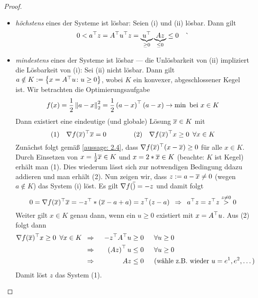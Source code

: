 \begin{proof}
	\begin{itemize}[leftmargin=*, nolistsep]
		\item \textit{höchstens} eines der Systeme ist lösbar: Seien (i) und (ii) lösbar. Dann gilt
		\begin{equation*}
			0 < a^{\top} z = A^{\top}u^{\top} z = \underbrace{u^{\top}}_{\ge 0} \underbrace{A z}_{\le 0} \le 0 \quad \lightning
		\end{equation*}
		\item  \textit{mindestens} eines der Systeme ist lösbar --- die Unlösbarkeit von (ii) impliziert die Lösbarkeit von (i):  Sei (ii) nicht lösbar. Dann gilt
		$a \notin K \mathrel{:=} \left\{ x = A^{\top} u \colon u \ge 0 \right\}$, wobei $K$ ein konvexer, abgeschlossener Kegel ist. Wir betrachten die Optimierungsaufgabe
		\begin{equation*}
			f(x) = \frac{1}{2} \left\lVert a-x \right\rVert_2^2 = \frac{1}{2} \left( a-x \right)^{\top}(a-x) \to \min \text{ bei } x \in K
		\end{equation*}
		Dann existiert eine eindeutige (und globale) Lösung $\overline{x} \in K$ mit
		\begin{equation*}
			(1) \quad \nabla f(\overline{x})^{\top} \overline{x} = 0 
			\qquad \qquad 
			(2) \quad \nabla f(\overline{x})^{\top} x \ge 0 \enskip \forall x \in K
		\end{equation*}
		Zunächst folgt gemäß \cref{aussage: 2.4}, dass $\nabla f(\overline{x})^{\top} (x - \overline{x}) \ge 0$ für alle $x \in K$. Durch Einsetzen von $x = \frac{1}{2} \overline{x} \in K$ und $x = 2*\overline{x} \in K$ (beachte: $K$ ist Kegel) erhält man (1). Dies wiederum lässt sich zur notwendigen Bedingung ddazu addieren und man erhält (2). 
		Nun zeigen wir, dass $z \mathrel{:=} a - \overline{x} \neq 0$ (wegen $a \notin K$) das System (i) löst. Es gilt $\nabla f(\overline{)} = -z$ und damit folgt
		\begin{equation*}
			0 = \nabla f(\overline{x})^{\top} \overline{x} = -z^{\top} * (\overline{x} - a + a) = z^{\top} (z-a)  \enskip \Rightarrow \enskip a^{\top} z = z^{\top} z \overset{z \neq 0}{>} 0
		\end{equation*}
		Weiter gilt $x \in K$ genau dann, wenn ein $u \ge 0$ existiert mit $x = A^{\top} u$. Aus (2) folgt dann 
		\begin{equation*}
			\begin{aligned}
			\nabla f(\overline{x})^{\top} x \ge 0 \enskip \forall x \in K &\enskip \Rightarrow \enskip& - z^{\top} A^{\top} u &\ge 0 \enskip &&\forall u \ge 0 \\
			&\enskip \Rightarrow \enskip& \left( Az \right)^{\top} u &\le 0 \enskip &&\forall u \ge 0 \\
			&\enskip \Rightarrow \enskip& Az &\le 0 && (\text{wähle z.B. wieder } u = e^1, e^2, \dots)
			\end{aligned}
		\end{equation*}
		Damit löst $z$ das System (1).
	\end{itemize}
\end{proof}

